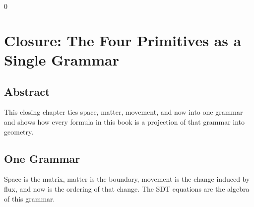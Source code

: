 0\documentclass[12pt]{book}
\begin{document}
\chapter{Closure: The Four Primitives as a Single Grammar}

\section*{Abstract}
This closing chapter ties space, matter, movement, and now into one grammar and shows how every formula
in this book is a projection of that grammar into geometry.

\section{One Grammar}
Space is the matrix, matter is the boundary, movement is the change induced by flux, and now is the
ordering of that change. The SDT equations are the algebra of this grammar.
\end{document}

